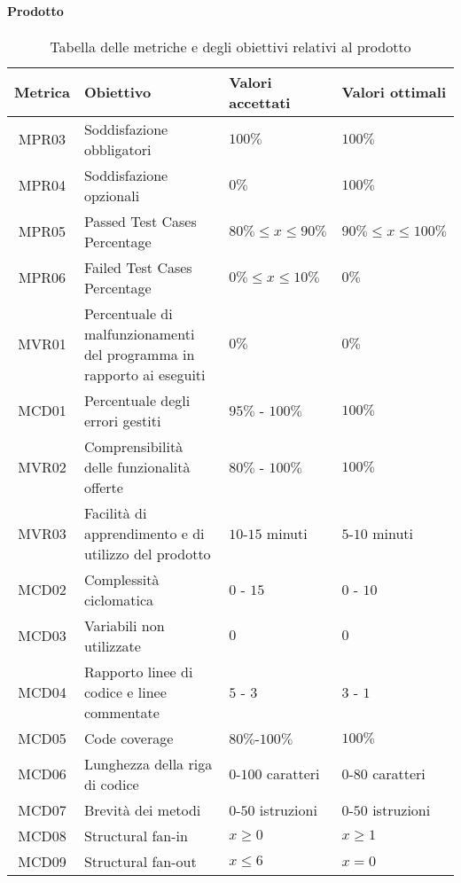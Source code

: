 \paragraph{Prodotto}
\begin{table}[H]
		\begin{center}
			\setlength{\aboverulesep}{0pt}
			\setlength{\belowrulesep}{0pt}
			\setlength{\extrarowheight}{.75ex}
			\begin{tabular}{ c C{6cm} C{3cm} C{3cm} }
				\textbf{Metrica} & \textbf{Obiettivo} & \textbf{Valori accettati} & \textbf{Valori ottimali}  \\
				\toprule
				MPR03 & Soddisfazione  obbligatori & $100 \%$ & $100 \%$ \\
				MPR04 & Soddisfazione  opzionali & $ 0 \%$ & $ 100\%$ \\
				MPR05 & Passed Test Cases Percentage & $80\% \leq x \leq 90\% $& $90\% \leq x \leq 100\%$ \\
				MPR06 & Failed Test Cases Percentage & $0\% \leq x \leq 10\% $& $0\%$ \\
				MVR01 & Percentuale di malfunzionamenti del programma in rapporto ai  eseguiti & $ 0\%$  & $0\%$ \\
				MCD01 & Percentuale degli errori gestiti & $ 95\%$ - $100\% $ & $100\%$ \\
				MVR02 & Comprensibilità delle funzionalità offerte & $ 80\%$ - $100\% $ & $100\%$ \\
				MVR03 & Facilità di apprendimento e di utilizzo del prodotto & $10$-$15$ minuti & $5$-$10$ minuti \\
				MCD02 & Complessità ciclomatica & $0$ - $15$ & $0$ - $10$ \\
				MCD03 & Variabili non utilizzate & $0$ & $0$ \\
				MCD04 & Rapporto linee di codice e linee commentate & $5$ - $3$ & $3$ - $1$\\
				MCD05 & Code coverage & $80\%$-$100\%$ & $100\%$ \\
				MCD06 & Lunghezza della riga di codice & $0$-$100$ caratteri & $0$-$80$ caratteri \\
				MCD07 & Brevità dei metodi & $0$-$50$ istruzioni & $0$-$50$ istruzioni \\
				MCD08 & Structural fan-in & $ x \geq 0 $ & $ x \geq 1 $ \\
				MCD09 & Structural fan-out & $ x \leq 6 $ & $ x = 0 $ \\
				\bottomrule
			\end{tabular}
			\caption{Tabella delle metriche e degli obiettivi relativi al prodotto}
		\end{center}
	\end{table}

